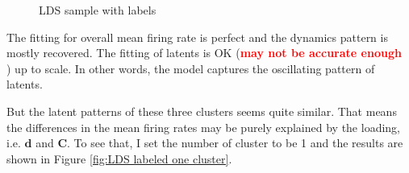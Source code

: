 \documentclass[]{article}
\begin{document}
\begin{figure}[h!]
	\caption{LDS sample with labels}
	\label{fig:LDS labeled}
\end{figure}

The fitting for overall mean firing rate is perfect and the dynamics pattern is mostly recovered. The fitting of latents is OK (\textcolor{red}{\textbf{may not be accurate enough}}\\) up to scale. In other words, the model captures the oscillating pattern of latents.

But the latent patterns of these three clusters seems quite similar. That means the differences in the mean firing rates may be purely explained by the loading, i.e. \(\mathbf{d}\) and \(\mathbf{C}\). To see that, I set the number of cluster to be 1 and the results are shown in Figure \ref{fig:LDS labeled one cluster}.
\end{document}
